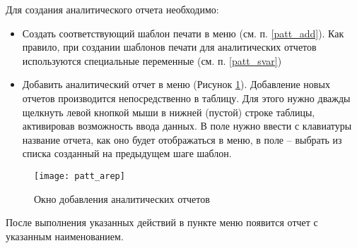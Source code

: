 Для создания аналитического отчета необходимо:
\begin{itemize}
 \item Создать соответствующий шаблон печати в меню  (см. п. \ref{patt_add}). Как правило, при создании шаблонов печати для аналитических отчетов используются специальные переменные (см. п. \ref{patt_svar})
 \item Добавить аналитический отчет в меню   (Рисунок \ref{img_patt_arep}). Добавление новых отчетов производится непосредственно в таблицу. Для этого нужно дважды щелкнуть левой кнопкой мыши в нижней (пустой) строке таблицы, активировав возможность ввода данных. В поле  нужно ввести с клавиатуры название отчета, как оно будет отображаться в меню, в поле  – выбрать из списка созданный на предыдущем шаге шаблон.
\end{itemize} 

\begin{figure}[ht]\centering
 \texttt{[image: patt\_arep]}
 \caption{Окно добавления аналитических отчетов}
 \label{img_patt_arep}
\end{figure}

После выполнения указанных действий в пункте меню  появится отчет с указанным наименованием.
